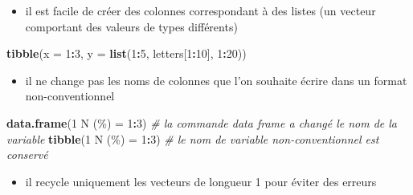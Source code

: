 \documentclass[
]{book}
\newenvironment{Shaded}{\begin{snugshade}}{\end{snugshade}}
\newcommand{\AttributeTok}[1]{\textcolor[rgb]{0.13,0.29,0.53}{#1}}
\newcommand{\CommentTok}[1]{\textcolor[rgb]{0.56,0.35,0.01}{\textit{#1}}}
\newcommand{\DecValTok}[1]{\textcolor[rgb]{0.00,0.00,0.81}{#1}}
\newcommand{\FunctionTok}[1]{\textcolor[rgb]{0.13,0.29,0.53}{\textbf{#1}}}
\newcommand{\NormalTok}[1]{#1}
\newcommand{\OtherTok}[1]{\textcolor[rgb]{0.56,0.35,0.01}{#1}}
\newcommand{\SpecialCharTok}[1]{\textcolor[rgb]{0.81,0.36,0.00}{\textbf{#1}}}
\newcommand{\StringTok}[1]{\textcolor[rgb]{0.31,0.60,0.02}{#1}}
\providecommand{\tightlist}{%
  \setlength{\itemsep}{0pt}\setlength{\parskip}{0pt}}
\begin{document}
\begin{itemize}
\tightlist
\item
  il est facile de créer des colonnes correspondant à des listes (un vecteur comportant des valeurs de types différents)
\end{itemize}

\begin{Shaded}
\begin{Highlighting}[]
\FunctionTok{tibble}\NormalTok{(}\AttributeTok{x =} \DecValTok{1}\SpecialCharTok{:}\DecValTok{3}\NormalTok{, }
       \AttributeTok{y =} \FunctionTok{list}\NormalTok{(}\DecValTok{1}\SpecialCharTok{:}\DecValTok{5}\NormalTok{, letters[}\DecValTok{1}\SpecialCharTok{:}\DecValTok{10}\NormalTok{], }\DecValTok{1}\SpecialCharTok{:}\DecValTok{20}\NormalTok{))}
\end{Highlighting}
\end{Shaded}

\begin{itemize}
\tightlist
\item
  il ne change pas les noms de colonnes que l'on souhaite écrire dans un format non-conventionnel
\end{itemize}

\begin{Shaded}
\begin{Highlighting}[]
\FunctionTok{data.frame}\NormalTok{(}\StringTok{\textasciigrave{}}\AttributeTok{1 N (\%)}\StringTok{\textasciigrave{}} \OtherTok{=} \DecValTok{1}\SpecialCharTok{:}\DecValTok{3}\NormalTok{) }\CommentTok{\# la commande data frame a changé le nom de la variable}
\FunctionTok{tibble}\NormalTok{(}\StringTok{\textasciigrave{}}\AttributeTok{1 N (\%)}\StringTok{\textasciigrave{}} \OtherTok{=} \DecValTok{1}\SpecialCharTok{:}\DecValTok{3}\NormalTok{) }\CommentTok{\# le nom de variable non{-}conventionnel est conservé}
\end{Highlighting}
\end{Shaded}

\begin{itemize}
\tightlist
\item
  il recycle uniquement les vecteurs de longueur 1 pour éviter des erreurs
\end{itemize}
\end{document}
